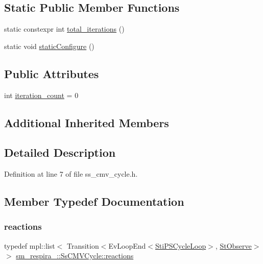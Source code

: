 \subsection*{Static Public Member Functions}
\begin{DoxyCompactItemize}
\item 
static constexpr int \hyperlink{structsm__respira__1_1_1SsCMVCycle_af33c1d460dcea6c9dd5275f860b53aee}{total\+\_\+iterations} ()
\item 
static void \hyperlink{structsm__respira__1_1_1SsCMVCycle_a83814dc5a1607704f1ca38cd205dc329}{static\+Configure} ()
\end{DoxyCompactItemize}
\subsection*{Public Attributes}
\begin{DoxyCompactItemize}
\item 
int \hyperlink{structsm__respira__1_1_1SsCMVCycle_a201c2de59431e5e5db575bede83a9f57}{iteration\+\_\+count} = 0
\end{DoxyCompactItemize}
\subsection*{Additional Inherited Members}


\subsection{Detailed Description}


Definition at line 7 of file ss\+\_\+cmv\+\_\+cycle.\+h.



\subsection{Member Typedef Documentation}
\mbox{\label{structsm__respira__1_1_1SsCMVCycle_a87e9c2d749f95092b86958b08a8b9ae4}} 
\subsubsection{\texorpdfstring{reactions}{reactions}}
{\footnotesize\ttfamily typedef mpl\+::list$<$ Transition$<$Ev\+Loop\+End$<$\hyperlink{structsm__respira__1_1_1cmv__cycle__inner__states_1_1StiPSCycleLoop}{Sti\+P\+S\+Cycle\+Loop}$>$, \hyperlink{structsm__respira__1_1_1StObserve}{St\+Observe}$>$ $>$ \hyperlink{structsm__respira__1_1_1SsCMVCycle_a87e9c2d749f95092b86958b08a8b9ae4}{sm\+\_\+respira\+\_\+::\+Ss\+C\+M\+V\+Cycle\+::reactions}}



